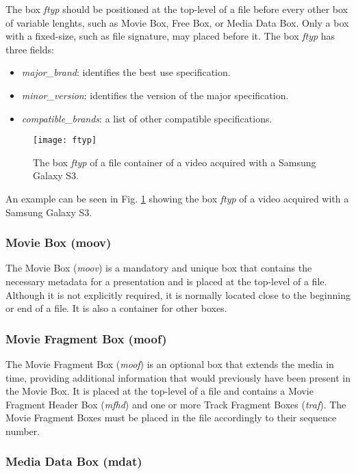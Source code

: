 The box \emph{ftyp} should be positioned at the top-level of a file before every other box of variable lenghts, such as Movie Box, Free Box, or Media Data Box. Only a box with a fixed-size, such as file signature, may placed before it. The box \emph{ftyp} has three fields:

\begin{itemize}
\item \emph{major\_brand}: identifies the best use specification.
\item \emph{minor\_version}: identifies the version of the major specification.
\item \emph{compatible\_brands}: a list of other compatible specifications.
\end{itemize}

\begin{figure}
  \centering
  \texttt{[image: ftyp]}
  \caption{The box \emph{ftyp} of a file container of a video acquired with a Samsung Galaxy S3.}\label{fig:ftyp}
\end{figure}

An example can be seen in Fig. \ref{fig:ftyp} showing the box \emph{ftyp} of a video acquired with a Samsung Galaxy S3.

\subsubsection*{Movie Box (moov)}

The Movie Box (\emph{moov}) is a mandatory and unique box that contains the necessary metadata for a presentation and is placed at the top-level of a file. Although it is not explicitly required, it is normally located close to the beginning or end of a file. It is also a container for other boxes.

\subsubsection*{Movie Fragment Box (moof)}

The Movie Fragment Box (\emph{moof}) is an optional box that extends the media in time, providing additional information that would previously have been present in the Movie Box. It is placed at the top-level of a file and contains a Movie Fragment Header Box (\emph{mfhd}) and one or more Track Fragment Boxes (\emph{traf}). The Movie Fragment Boxes must be placed in the file accordingly to their sequence number.

\subsubsection*{Media Data Box (mdat)}

